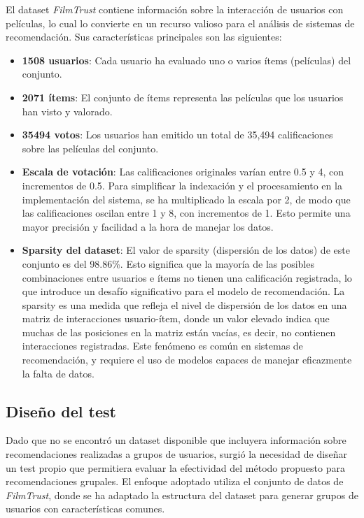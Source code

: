 \documentclass[twocolumn, fontsize=10pt]{article}
\begin{document}
 El dataset \textit{FilmTrust} contiene información 
 sobre la interacción de usuarios con películas, 
 lo cual lo convierte en un recurso valioso para el 
 análisis de sistemas de recomendación. 
 Sus características principales son las siguientes:
 \begin{itemize}
    \item \textbf{1508 usuarios}: Cada usuario ha 
    evaluado uno o varios ítems (películas) del conjunto.
    \item \textbf{2071 ítems}: El conjunto de ítems representa las películas que los usuarios han visto y valorado.
    \item \textbf{35494 votos}: Los usuarios han emitido un total de 35,494 calificaciones sobre las películas del conjunto.
    \item \textbf{Escala de votación}: Las calificaciones originales varían entre 0.5 y 4, con incrementos de 0.5. Para simplificar la indexación y el procesamiento en la implementación del sistema, se ha multiplicado la escala por 2, de modo que las calificaciones oscilan entre 1 y 8, con incrementos de 1. Esto permite una mayor precisión y facilidad a la hora de manejar los datos.
    \item \textbf{Sparsity del dataset}: El valor de sparsity (dispersión de los datos) de este conjunto es del 98.86\%. Esto significa que la mayoría de las posibles combinaciones entre usuarios e ítems no tienen una calificación registrada, lo que introduce un desafío significativo para el modelo de recomendación. La sparsity es una medida que refleja el nivel de dispersión de los datos en una matriz de interacciones usuario-ítem, donde un valor elevado indica que muchas de las posiciones en la matriz están vacías, es decir, no contienen interacciones registradas. Este fenómeno es común en sistemas de recomendación, y requiere el uso de modelos capaces de manejar eficazmente la falta de datos.
 \end{itemize}

 \subsection{Diseño del test}
 Dado que no se encontró un dataset disponible que incluyera información sobre recomendaciones realizadas a grupos de usuarios, surgió la necesidad de diseñar un test propio que permitiera evaluar la efectividad del método propuesto para recomendaciones grupales. El enfoque adoptado utiliza el conjunto de datos de \textit{FilmTrust}, donde se ha adaptado la estructura del dataset para generar grupos de usuarios con características comunes.
\end{document}
